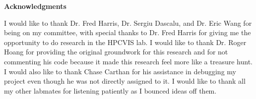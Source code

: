 \newpage
{}
\begin{center}
  \bf {Acknowledgments}
\end{center}

I would like to thank Dr. Fred Harris, Dr. Sergiu Dascalu, and Dr. Eric Wang for being on my committee, with special thanks to Dr. Fred Harris for giving me the opportunity to do research in the HPCVIS lab. I would like to thank Dr. Roger Hoang for providing the original groundwork for this research and for not commenting his code because it made this research feel more like a treasure hunt. I would also like to thank Chase Carthan for his assistance in debugging my project even though he was not directly assigned to it. I would like to thank all my other labmates for listening patiently as I bounced ideas off them. 